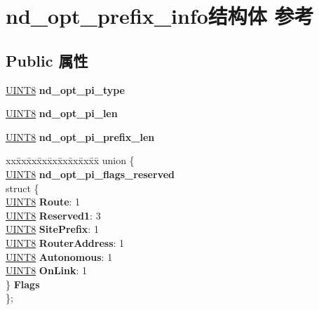 \hypertarget{structnd__opt__prefix__info}{}\section{nd\+\_\+opt\+\_\+prefix\+\_\+info结构体 参考}
\label{structnd__opt__prefix__info}
\subsection*{Public 属性}
\begin{DoxyCompactItemize}
\item 
\mbox{\label{structnd__opt__prefix__info_a78e4ded94c7d8e8a1ab3869464df4bc9}} 
\hyperlink{_processor_bind_8h_ab27e9918b538ce9d8ca692479b375b6a}{U\+I\+N\+T8} {\bfseries nd\+\_\+opt\+\_\+pi\+\_\+type}
\item 
\mbox{\label{structnd__opt__prefix__info_aa5cb1aae8a90f23eeb20b5792c1a29db}} 
\hyperlink{_processor_bind_8h_ab27e9918b538ce9d8ca692479b375b6a}{U\+I\+N\+T8} {\bfseries nd\+\_\+opt\+\_\+pi\+\_\+len}
\item 
\mbox{\label{structnd__opt__prefix__info_a14cca26bd8bab2970e01524c2ef97de8}} 
\hyperlink{_processor_bind_8h_ab27e9918b538ce9d8ca692479b375b6a}{U\+I\+N\+T8} {\bfseries nd\+\_\+opt\+\_\+pi\+\_\+prefix\+\_\+len}
\item 
\mbox{\label{structnd__opt__prefix__info_af4624fb810c340ea18110f8493186a80}} 
\begin{tabbing}
xx\=xx\=xx\=xx\=xx\=xx\=xx\=xx\=xx\=\kill
union \{\\
\>\hyperlink{_processor_bind_8h_ab27e9918b538ce9d8ca692479b375b6a}{UINT8} {\bfseries nd\_opt\_pi\_flags\_reserved}\\
\>struct \{\\
\>\>\hyperlink{_processor_bind_8h_ab27e9918b538ce9d8ca692479b375b6a}{UINT8} {\bfseries Route}: 1\\
\>\>\hyperlink{_processor_bind_8h_ab27e9918b538ce9d8ca692479b375b6a}{UINT8} {\bfseries Reserved1}: 3\\
\>\>\hyperlink{_processor_bind_8h_ab27e9918b538ce9d8ca692479b375b6a}{UINT8} {\bfseries SitePrefix}: 1\\
\>\>\hyperlink{_processor_bind_8h_ab27e9918b538ce9d8ca692479b375b6a}{UINT8} {\bfseries RouterAddress}: 1\\
\>\>\hyperlink{_processor_bind_8h_ab27e9918b538ce9d8ca692479b375b6a}{UINT8} {\bfseries Autonomous}: 1\\
\>\>\hyperlink{_processor_bind_8h_ab27e9918b538ce9d8ca692479b375b6a}{UINT8} {\bfseries OnLink}: 1\\
\>\} {\bfseries Flags}\\
\}; \\


\end{tabbing}
\end{DoxyCompactItemize}
